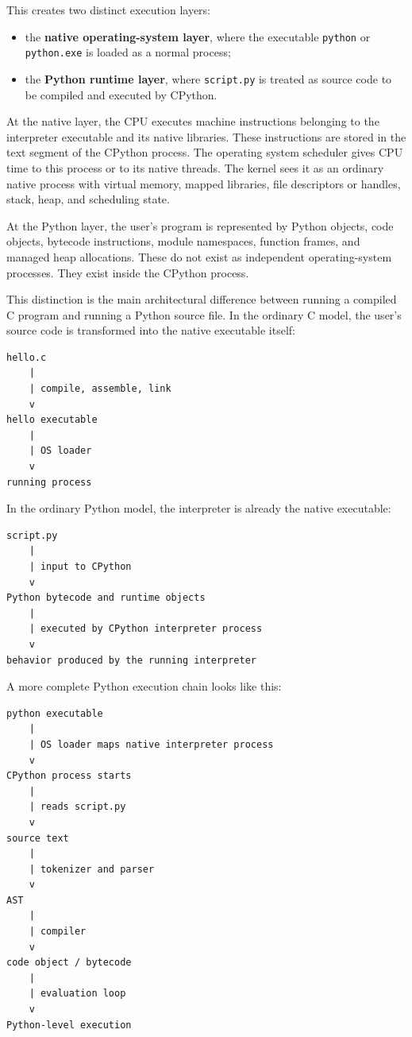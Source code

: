 This creates two distinct execution layers:

\begin{itemize}
    \item the \textbf{native operating-system layer}, where the executable \texttt{python} or \texttt{python.exe} is loaded as a normal process;
    \item the \textbf{Python runtime layer}, where \texttt{script.py} is treated as source code to be compiled and executed by CPython.
\end{itemize}

At the native layer, the CPU executes machine instructions belonging to the interpreter executable and its native libraries. These instructions are stored in the text segment of the CPython process. The operating system scheduler gives CPU time to this process or to its native threads. The kernel sees it as an ordinary native process with virtual memory, mapped libraries, file descriptors or handles, stack, heap, and scheduling state.

At the Python layer, the user's program is represented by Python objects, code objects, bytecode instructions, module namespaces, function frames, and managed heap allocations. These do not exist as independent operating-system processes. They exist inside the CPython process.

This distinction is the main architectural difference between running a compiled C program and running a Python source file. In the ordinary C model, the user's source code is transformed into the native executable itself:

\begin{verbatim}
hello.c
    |
    | compile, assemble, link
    v
hello executable
    |
    | OS loader
    v
running process
\end{verbatim}

In the ordinary Python model, the interpreter is already the native executable:

\begin{verbatim}
script.py
    |
    | input to CPython
    v
Python bytecode and runtime objects
    |
    | executed by CPython interpreter process
    v
behavior produced by the running interpreter
\end{verbatim}

A more complete Python execution chain looks like this:

\begin{verbatim}
python executable
    |
    | OS loader maps native interpreter process
    v
CPython process starts
    |
    | reads script.py
    v
source text
    |
    | tokenizer and parser
    v
AST
    |
    | compiler
    v
code object / bytecode
    |
    | evaluation loop
    v
Python-level execution
\end{verbatim}


